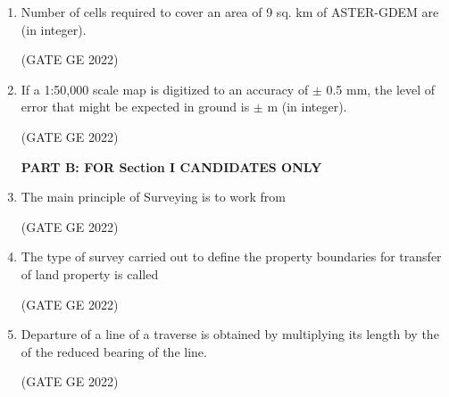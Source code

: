 \documentclass[journal,12pt,onecolumn]{IEEEtran}
\theoremstyle{remark}
\begin{document}
\begin{enumerate}
\item Number of cells required to cover an area of 9 sq. km of ASTER-GDEM are \makebox[1cm]{\hrulefill} (in integer).

\hfill (GATE GE 2022)

\item If a 1:50,000 scale map is digitized to an accuracy of $\pm$ 0.5 mm, the level of error that might be expected in ground is $\pm$ \makebox[1cm]{\hrulefill} m (in integer).

\hfill (GATE GE 2022)

\textbf{PART B: FOR Section I CANDIDATES ONLY}

\item The main principle of Surveying is to work from

\hfill (GATE GE 2022)

\begin{enumerate}
\end{enumerate}

\item The type of survey carried out to define the property boundaries for transfer of land property is called

\hfill (GATE GE 2022)

\begin{enumerate}
\end{enumerate}

\item Departure of a line of a traverse is obtained by multiplying its length by the \makebox[1cm]{\hrulefill} of the reduced bearing of the line.

\hfill (GATE GE 2022)

\begin{enumerate}
\end{enumerate}


\end{enumerate}
\end{document}
